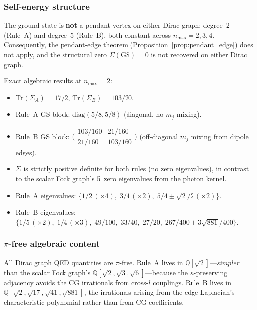 \documentclass[11pt]{article}
\begin{document}
\subsubsection{Self-energy structure}

The ground state is \textbf{not} a pendant vertex on either Dirac
graph: degree~2 (Rule~A) and degree~5 (Rule~B), both constant across
$n_{\max} = 2, 3, 4$.  Consequently, the pendant-edge theorem
(Proposition~\ref{prop:pendant_edge}) does not apply, and the
structural zero $\Sigma(\mathrm{GS}) = 0$ is not recovered on either
Dirac graph.

Exact algebraic results at $n_{\max} = 2$:
\begin{itemize}
\item $\mathrm{Tr}(\Sigma_A) = 17/2$, \quad
      $\mathrm{Tr}(\Sigma_B) = 103/20$.
\item Rule~A GS block: $\mathrm{diag}(5/8, 5/8)$ (diagonal, no
  $m_j$ mixing).
\item Rule~B GS block:
  $\bigl(\begin{smallmatrix} 103/160 & 21/160 \\
  21/160 & 103/160 \end{smallmatrix}\bigr)$ (off-diagonal $m_j$
  mixing from dipole edges).
\item $\Sigma$ is strictly positive definite for both rules (no zero
  eigenvalues), in contrast to the scalar Fock graph's 5~zero
  eigenvalues from the photon kernel.
\item Rule~A eigenvalues:
  $\{1/2\,({\times}4),\; 3/4\,({\times}2),\;
  5/4 \pm \sqrt{2}/2\,({\times}2)\}$.
\item Rule~B eigenvalues:
  $\{1/5\,({\times}2),\; 1/4\,({\times}3),\;
  49/100,\; 33/40,\; 27/20,\;
  267/400 \pm 3\sqrt{881}/400\}$.
\end{itemize}

\subsubsection{$\pi$-free algebraic content}

All Dirac graph QED quantities are $\pi$-free.  Rule~A lives in
$\mathbb{Q}[\sqrt{2}]$---\emph{simpler} than the scalar Fock graph's
$\mathbb{Q}[\sqrt{2}, \sqrt{3}, \sqrt{6}]$---because the
$\kappa$-preserving adjacency avoids the CG irrationals from cross-$l$
couplings.  Rule~B lives in
$\mathbb{Q}[\sqrt{2}, \sqrt{17}, \sqrt{41}, \sqrt{881}]$, the
irrationals arising from the edge Laplacian's characteristic
polynomial rather than from CG coefficients.
\end{document}
